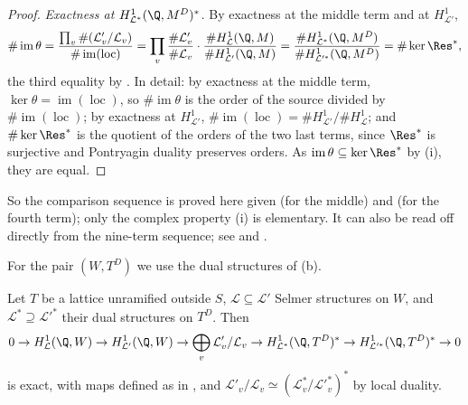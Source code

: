 \begin{proof}
\emph{Exactness at $H^1_{\mathcal L^*}(\Q,M^D)^*$.} By exactness at the middle term and at $H^1_{\mathcal L'}$,
\[
\#\operatorname{im}\theta=\frac{\prod_v\#(\mathcal L'_v/\mathcal L_v)}{\#\operatorname{im}(\operatorname{loc})}=\prod_v\frac{\#\mathcal L'_v}{\#\mathcal L_v}\cdot\frac{\#H^1_{\mathcal L}(\Q,M)}{\#H^1_{\mathcal L'}(\Q,M)}
=\frac{\#H^1_{\mathcal L^*}(\Q,M^D)}{\#H^1_{\mathcal L'^*}(\Q,M^D)}=\#\ker\Res^*,
\]
the third equality by . In detail: by exactness at the middle term, $\ker\theta=\operatorname{im}(\operatorname{loc})$, so
$\#\operatorname{im}\theta$ is the order of the source divided by $\#\operatorname{im}(\operatorname{loc})$; by exactness at $H^1_{\mathcal L'}$, $\#\operatorname{im}(\operatorname{loc})=\#H^1_{\mathcal L'}/\#H^1_{\mathcal L}$; and
$\#\ker\Res^*$ is the quotient of the orders of the two last terms, since $\Res^*$ is surjective and Pontryagin duality preserves orders. As $\operatorname{im}\theta\subseteq\ker\Res^*$
by (i), they are equal.
\end{proof}

\noindent So the comparison sequence is proved here given  (for the middle) and  (for the fourth term); only the
complex property (i) is elementary. It can also be read off directly from the nine-term sequence; see \cite[Section 1.7]{Rubin} and \cite[Section 2.3]{MazurRubin04}.

For the pair $(W,T^D)$ we use the dual structures of (b).

\begin{theorem}\label{thm:galcoh:comparison-l-adic}
Let $T$ be a lattice unramified outside $S$, $\mathcal L\subseteq\mathcal L'$ Selmer structures on $W$, and $\mathcal L^*\supseteq\mathcal L'^*$ their dual structures on $T^D$. Then
\[
0\to H^1_{\mathcal L}(\Q,W)\to H^1_{\mathcal L'}(\Q,W)\to\bigoplus_v\mathcal L'_v/\mathcal L_v\to H^1_{\mathcal L^*}(\Q,T^D)^*\to H^1_{\mathcal L'^*}(\Q,T^D)^*\to0
\]
is exact, with maps defined as in , and $\mathcal L'_v/\mathcal L_v\simeq(\mathcal L^*_v/\mathcal L'^*_v)^*$ by local duality.
\end{theorem}

